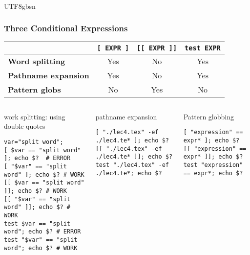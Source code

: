 \documentclass[red]{beamer}
\newcommand*{\lstverb}{\lstinline[style=caret]}
\begin{document}
\begin{CJK*}{UTF8}{gbsn}
\begin{frame}
\frametitle{Three Conditional Expressions}
\begin{table}[ht]
\tiny
\renewcommand\arraystretch{1.6}
\begin{tabular}{lccc}
\hline
 & \lstverb|[ EXPR ]| & \lstverb|[[ EXPR ]]| & \lstverb|test EXPR|\\
\hline
\textbf{Word splitting} & Yes & No & Yes\\
\textbf{Pathname expansion} & Yes & No & Yes\\
\textbf{Pattern globs} & No & Yes & No\\ 
\hline
\end{tabular}
\end{table}
\begin{columns}[t]
\begin{block}{\centering\scriptsize work splitting: using double quotes}
\begin{lstlisting}[basicstyle=\tiny\ttfamily]
var="split word";
[ $var == "split word" ]; echo $?  # ERROR
[ "$var" == "split word" ]; echo $? # WORK
[[ $var == "split word" ]]; echo $? # WORK
[[ "$var" == "split word" ]]; echo $? # WORK
test $var == "split word"; echo $? # ERROR
test "$var" == "split word"; echo $? # WORK
\end{lstlisting}
\end{block}
\begin{block}{\centering\scriptsize pathname expansion}
\begin{lstlisting}[basicstyle=\tiny\ttfamily]
[ "./lec4.tex" -ef ./lec4.te* ]; echo $?
[[ "./lec4.tex" -ef ./lec4.te* ]]; echo $?
test "./lec4.tex" -ef ./lec4.te*; echo $?
\end{lstlisting}
\end{block}
\begin{block}{\centering\scriptsize Pattern globbing}
\begin{lstlisting}[basicstyle=\tiny\ttfamily]
[ "expression" == expr* ]; echo $?
[[ "expression" == expr* ]]; echo $?
test "expression" == expr*; echo $?
\end{lstlisting}
\end{block}
\end{columns}
\end{frame}



\end{CJK*}
\end{document}
